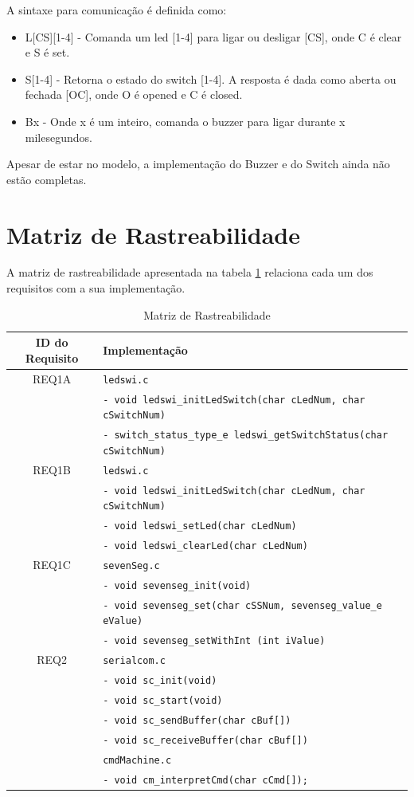 \documentclass{article}
\begin{document}
A sintaxe para comunicação é definida como:
\begin{itemize}
\item L[CS][1-4] - Comanda um led [1-4] para ligar ou desligar [CS], onde C é clear e S é set.
\item S[1-4] - Retorna o estado do switch [1-4]. A resposta é dada como aberta ou fechada [OC], onde O é opened e C é closed.
\item Bx - Onde x é um inteiro, comanda o buzzer para ligar durante x milesegundos.
\end{itemize}

Apesar de estar no modelo, a implementação do Buzzer e do Switch ainda não estão completas.


\section{Matriz de Rastreabilidade}
A matriz de rastreabilidade apresentada na tabela \ref*{tab:rastreabilidade} relaciona cada um dos requisitos com a sua implementação.
\begin{table}[H]
	\centering
	\caption{Matriz de Rastreabilidade}
	\label{tab:rastreabilidade}
	\small
	\begin{tabular}{|c|l|}
		\hline \bfseries{ID do Requisito} & \bfseries{Implementação}\\ 
		\hline REQ1A 	& \texttt{ledswi.c}\\ 
						& \texttt{- void ledswi\_initLedSwitch(char cLedNum, char cSwitchNum)}\\
						& \texttt{- switch\_status\_type\_e ledswi\_getSwitchStatus(char cSwitchNum)}\\
		\hline REQ1B 	& \texttt{ledswi.c}\\ 
						& \texttt{- void ledswi\_initLedSwitch(char cLedNum, char cSwitchNum)}\\
						& \texttt{- void ledswi\_setLed(char cLedNum)}\\ 
						& \texttt{- void ledswi\_clearLed(char cLedNum)}\\
		\hline REQ1C 	& \texttt{sevenSeg.c}\\ 
						& \texttt{- void sevenseg\_init(void)}\\
						& \texttt{- void sevenseg\_set(char cSSNum, sevenseg\_value\_e eValue)}\\
						& \texttt{- void sevenseg\_setWithInt (int iValue)}\\
		\hline REQ2	 	& \texttt{serialcom.c}\\ 
						& \texttt{- void sc\_init(void)}\\
						& \texttt{- void sc\_start(void)}\\
						& \texttt{- void sc\_sendBuffer(char cBuf[])}\\
						& \texttt{- void sc\_receiveBuffer(char cBuf[])}\\
					& \texttt{cmdMachine.c}\\ 
						& \texttt{- void cm\_interpretCmd(char cCmd[]);}\\
		\hline 
	\end{tabular} 
	\normalsize
\end{table}
\end{document}
